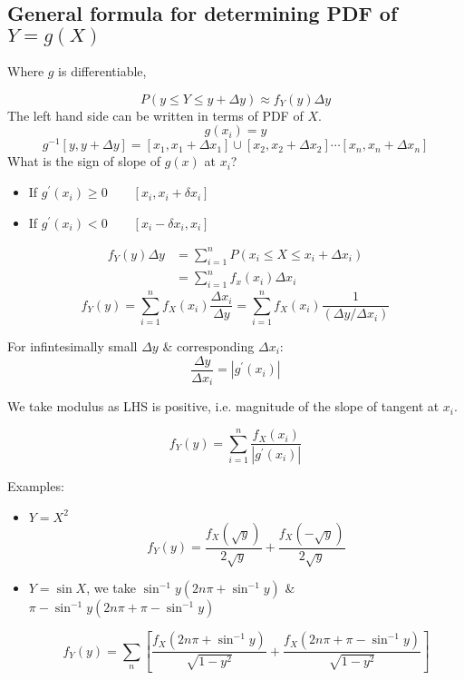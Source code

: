 \documentclass{article}
\begin{document}
    \subsection{General formula for determining PDF of $Y= g(X)$}
    Where $g$ is differentiable,

    $$ P(y \leq Y \leq y + \Delta y) \approx f_Y(y)\Delta y$$
    The left hand side can be written in terms of PDF of $X$.
    $$ g(x_i)= y$$
    $$ g^{-1}[y,y + \Delta y]= [x_1, x_1+ \Delta x_1]\cup [x_2, x_2+ \Delta x_2] \cdots [x_n, x_n+ \Delta x_n]$$
What is the sign of slope of $g(x)$ at $x_i$?
\begin{itemize}
    \item If $g^{'} (x_i) \geq 0 \qquad [x_i,x_i+ \delta x_i]$
    \item If $g^{'} (x_i) < 0 \qquad [x_i- \delta x_i,x_i]$
\end{itemize}

\begin{align*}
    f_Y(y)\Delta y &= \sum_{i=1}^{n}P(x_i \leq X \leq x_i + \Delta x_i)\\
                    &= \sum_{i=1}^{n} f_x(x_i)\Delta x_i
\end{align*}
$$ f_Y(y)= \sum_{i=1}^{n} f_X(x_i)\frac{\Delta x_i}{\Delta y}= \sum_{i=1}^{n} f_X(x_i)\frac{1}{(\Delta y / \Delta x_i)}$$

For infintesimally small $\Delta y$ \& corresponding $\Delta x_i$:
$$ \frac{\Delta y}{\Delta x_i}= |g^{'}(x_i)|$$

We take modulus as LHS is positive, i.e. magnitude of the slope of tangent at $x_i$.

$$ f_Y(y) = \sum_{i=1}^{n} \frac{f_X(x_i)}{|g^{'}(x_i)|}$$

Examples:
\begin{itemize}
    \item $Y= X^2$
    $$ f_Y(y)= \frac{f_X(\sqrt{y})}{2\sqrt{y}}+ \frac{f_X(-\sqrt{y})}{2\sqrt{y}}$$
    \item $Y= \sin X$, we take $\sin^{-1} y(2n\pi + \sin^{-1} y)$ \& $\pi - \sin^{-1} y(2n\pi + \pi - \sin^{-1} y)$

    $$ f_Y(y)= \sum_{n}\left[ \frac{f_X(2n\pi + \sin^{-1} y)}{\sqrt{1- y^2}} + \frac{f_X(2n\pi + \pi - \sin^{-1} y)}{\sqrt{1- y^2}} \right]$$
\end{itemize}

\end{document}
